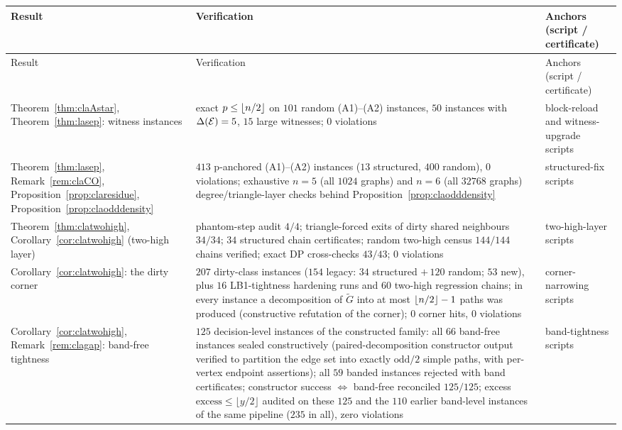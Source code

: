 \begingroup\small
\begin{longtable}{p{4.6cm} p{6.2cm} p{4.2cm}}
\hline
Result & Verification & Anchors (script / certificate) \\
\hline
\endfirsthead
\hline
Result & Verification & Anchors (script / certificate) \\
\hline
\endhead
Theorem~\ref{thm:claAstar}, Theorem~\ref{thm:lasep}: witness instances &
exact $p\le\left\lfloor n/2 \right\rfloor$ on $101$ random (A1)--(A2) instances, $50$
instances with $\Delta(\mathcal{E})=5$, $15$ large witnesses; $0$ violations &
block-reload and witness-upgrade scripts\\
\hline
Theorem~\ref{thm:lasep}, Remark~\ref{rem:claCO},
Proposition~\ref{prop:claresidue}, Proposition~\ref{prop:claodddensity} &
$413$ p-anchored (A1)--(A2) instances ($13$ structured, $400$ random),
$0$ violations; exhaustive $n=5$ (all $1024$ graphs) and $n=6$ (all
$32768$ graphs) degree/triangle-layer checks behind
Proposition~\ref{prop:claodddensity} & structured-fix scripts\\
\hline
Theorem~\ref{thm:clatwohigh}, Corollary~\ref{cor:clatwohigh} (two-high
layer) & phantom-step audit $4/4$; triangle-forced exits of dirty shared
neighbours $34/34$; $34$ structured chain certificates; random two-high
census $144/144$ chains verified; exact DP cross-checks $43/43$; $0$
violations & two-high-layer scripts\\
\hline
Corollary~\ref{cor:clatwohigh}: the dirty corner & $207$ dirty-class
instances ($154$ legacy: $34$ structured $+\,120$ random; $53$ new), plus
$16$ LB1-tightness hardening runs and $60$ two-high regression chains; in
every instance a decomposition of $\tilde G$ into at most
$\left\lfloor n/2 \right\rfloor-1$ paths was produced (constructive refutation of the
corner); $0$ corner hits, $0$ violations & corner-narrowing scripts\\
\hline
Corollary~\ref{cor:clatwohigh}, Remark~\ref{rem:clagap}: band-free
tightness & $125$ decision-level instances of the constructed family:
all $66$ band-free instances sealed constructively (paired-decomposition
constructor output verified to partition the edge set into exactly
$\mathrm{odd}/2$ simple paths, with per-vertex endpoint assertions); all
$59$ banded instances rejected with band certificates; constructor
success $\iff$ band-free reconciled $125/125$; excess
$\mathrm{excess}\le\lfloor y/2\rfloor$ audited on these $125$ and the
$110$ earlier band-level instances of the same pipeline ($235$ in all),
zero violations & band-tightness scripts\\

\end{longtable}
